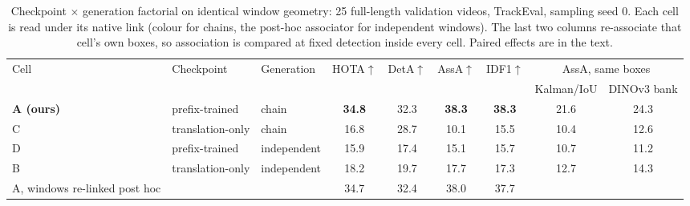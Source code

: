 \documentclass{article} %
\newcommand{\rev}[1]{{\color{blue}#1}}
\begin{document}
\begin{table}[t]
\caption{\rev{Checkpoint $\times$ generation factorial on identical window geometry: 25
full-length validation videos, TrackEval, sampling seed 0. Each cell is read under its
native link (colour for chains, the post-hoc associator for independent windows). The last
two columns re-associate that cell's own boxes, so association is compared at fixed
detection inside every cell. Paired effects are in the text.}}
\label{tab:ab}
\begin{center}
\scriptsize
\setlength{\tabcolsep}{3pt}
\begin{tabular}{lllcccccc}
\toprule
\rev{Cell} & \rev{Checkpoint} & \rev{Generation} & \rev{HOTA$\uparrow$} & \rev{DetA$\uparrow$} & \rev{AssA$\uparrow$} & \rev{IDF1$\uparrow$} & \multicolumn{2}{c}{\rev{AssA, same boxes}} \\
 & & & & & & & \rev{Kalman/IoU} & \rev{DINOv3 bank} \\
\midrule
\rev{\textbf{A (ours)}} & \rev{prefix-trained} & \rev{chain} & \rev{\textbf{34.8}} & \rev{32.3} & \rev{\textbf{38.3}} & \rev{\textbf{38.3}} & \rev{21.6} & \rev{24.3} \\
\rev{C} & \rev{translation-only} & \rev{chain} & \rev{16.8} & \rev{28.7} & \rev{10.1} & \rev{15.5} & \rev{10.4} & \rev{12.6} \\
\rev{D} & \rev{prefix-trained} & \rev{independent} & \rev{15.9} & \rev{17.4} & \rev{15.1} & \rev{15.7} & \rev{10.7} & \rev{11.2} \\
\rev{B} & \rev{translation-only} & \rev{independent} & \rev{18.2} & \rev{19.7} & \rev{17.7} & \rev{17.3} & \rev{12.7} & \rev{14.3} \\
\midrule
\rev{A, windows re-linked post hoc} & & & \rev{34.7} & \rev{32.4} & \rev{38.0} & \rev{37.7} & & \\
\bottomrule
\end{tabular}
\end{center}
\end{table}
\end{document}
